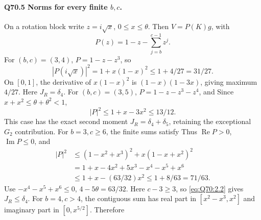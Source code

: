 \paragraph{Q70.5 Norms for every finite \(b,\allowbreak c\).}
On a rotation block write \(z=\allowbreak i\sqrt x\), \(0\le\allowbreak  x\le\allowbreak \theta\).
Then \(V=\allowbreak P(K)g\), with
\begin{equation}\tag{Q70.5.1}\label{eq:Q70:5.1}
P(z)=1-z-\sum_{j=b}^{c-1}z^j.
\end{equation}
For \((b,\allowbreak c)=\allowbreak (3,\allowbreak 4)\), \(P=\allowbreak 1-z-z^3\), so
\begin{equation}\tag{Q70.5.2}\label{eq:Q70:5.2}
|P(i\sqrt x)|^2=1+x(1-x)^2\le1+4/27=31/27.
\end{equation}
On \([0,\allowbreak 1]\), the derivative of \(x(1-x)^2\) is
\((1-x)(1-3x)\), giving maximum \(4/27\). Here \(J_R=\allowbreak \delta_4\).
For \((b,\allowbreak c)=\allowbreak (3,\allowbreak 5)\), \(P=\allowbreak 1-z-z^3-z^4\), and
Since \(x+x^2\le\allowbreak \theta+\theta^2<\allowbreak 1\),
\begin{equation}\tag{Q70.5.3}\label{eq:Q70:5.3}
|P|^2\le1+x-3x^2\le13/12.
\end{equation}
This case has the exact second moment \(J_R=\allowbreak \delta_4+\delta_5\),
retaining the exceptional \(G_2\) contribution.
For \(b=\allowbreak 3,\allowbreak c\ge\allowbreak 6\), the finite sums satisfy
Thus \(\operatorname{Re}P>\allowbreak 0\), \(\operatorname{Im}P\le\allowbreak 0\), and
\begin{equation}\tag{Q70.5.4}\label{eq:Q70:5.4}
\begin{aligned}
|P|^2&\le(1-x^2+x^3)^2+x(1-x+x^2)^2\\
 &=1+x-4x^2+5x^3-x^4-x^5+x^6\\
 &\le1+x-(63/32)x^2\le1+8/63=71/63.
\end{aligned}
\end{equation}
Use \(-x^4-x^5+x^6\le\allowbreak 0\), \(4-5\theta=\allowbreak 63/32\).
Here \(c-3\ge\allowbreak 3\), so \eqref{eq:Q70:2.2} gives \(J_R\le\allowbreak \delta_4\).
For \(b=\allowbreak 4,\allowbreak c>\allowbreak 4\), the contiguous sum has real part in
\([x^2-x^3,\allowbreak x^2]\) and imaginary part in \([0,\allowbreak x^{5/2}]\). Therefore
